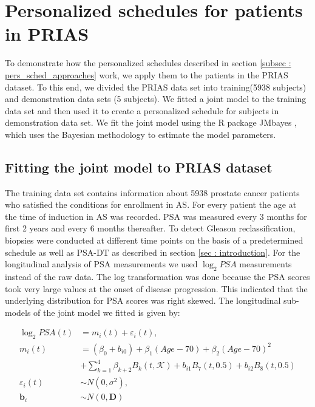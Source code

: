 
\section{Personalized schedules for patients in PRIAS}
\label{sec : pers_schedule_PRIAS}

To demonstrate how the personalized schedules described in section \ref{subsec : pers_sched_approaches} work, we apply them to the patients in the PRIAS dataset. To this end, we divided the PRIAS data set into training(5938 subjects) and demonstration data sets (5 subjects). We fitted a joint model to the training data set and then used it to create a personalized schedule for subjects in demonstration data set. We fit the joint model using the R package JMbayes \citep{rizopoulosJMbayes}, which uses the Bayesian methodology to estimate the model parameters. 

\subsection{Fitting the joint model to PRIAS dataset}
The training data set contains information about 5938 prostate cancer patients who satisfied the conditions for enrollment in AS. For every patient the age at the time of induction in AS was recorded. PSA was measured every 3 months for first 2 years and every 6 months thereafter. To detect Gleason reclassification, biopsies were conducted at different time points on the basis of a predetermined schedule as well as PSA-DT as described in section \ref{sec : introduction}. For the longitudinal analysis of PSA measurements we used $\log_2 PSA$ measurements instead of the raw data. The log transformation was done because the PSA scores took very large values at the onset of disease progression. This indicated that the underlying distribution for PSA scores was right skewed. The longitudinal sub-models of the joint model we fitted is given by:

\begin{align*}
\log_2 PSA(t) &= m_i(t) + \varepsilon_i(t), \\
m_i(t) &= (\beta_0 + b_{i0}) + \beta_1 (Age-70) + \beta_2 (Age-70)^2\\ 
&+ \sum_{k=1}^4 \beta_{k+2} B_k(t,\mathcal{K}) + b_{i1} B_7(t, 0.5) + b_{i2} B_8(t, 0.5) \\
\varepsilon_i(t) & \sim N(0, \sigma^2),\\
\boldsymbol{b}_i & \sim N(0, \boldsymbol{D})
\end{align*}

